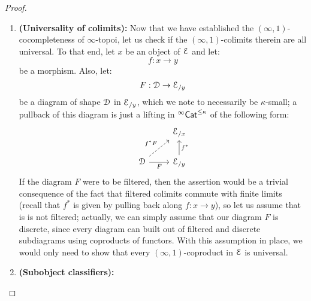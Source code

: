 \begin{proof}
\begin{enumerate}
                            \item \textbf{(Universality of colimits):} Now that we have established the $(\infty, 1)$-cocompleteness of $\infty$-topoi, let us check if the $(\infty, 1)$-colimits therein are all universal. To that end, let $x$ be an object of $\mathcal{E}$ and let:
                                $$f: x \to y$$
                            be a morphism. Also, let:
                                $$F: \mathcal{D} \to \mathcal{E}_{/y}$$
                            be a diagram of shape $\mathcal{D}$ in $\mathcal{E}_{/y}$, which we note to necessarily be $\kappa$-small; a pullback of this diagram is just a lifting in ${}^{\infty}\mathsf{Cat}^{\leq \kappa}$ of the following form:
                                $$
                                    \begin{tikzcd}
                                    	& {\E_{/x}} \\
                                    	\D & {\E_{/y}}
                                    	\arrow["{f^*}"', from=2-2, to=1-2]
                                    	\arrow["F"', from=2-1, to=2-2]
                                    	\arrow["{f^*F}", dashed, from=2-1, to=1-2]
                                    \end{tikzcd}
                                $$
                            If the diagram $F$ were to be filtered, then the assertion would be a trivial consequence of the fact that filtered colimits commute with finite limits (recall that $f^*$ is given by pulling back along $f: x \to y$), so let us assume that is is not filtered; actually, we can simply assume that our diagram $F$ is discrete, since every diagram can built out of filtered and discrete subdiagrams using coproducts of functors. With this assumption in place, we would only need to show that every $(\infty, 1)$-coproduct in $\mathcal{E}$ is universal. 
                            \item \textbf{(Subobject classifiers):}
                        \end{enumerate}
                    \end{proof}
